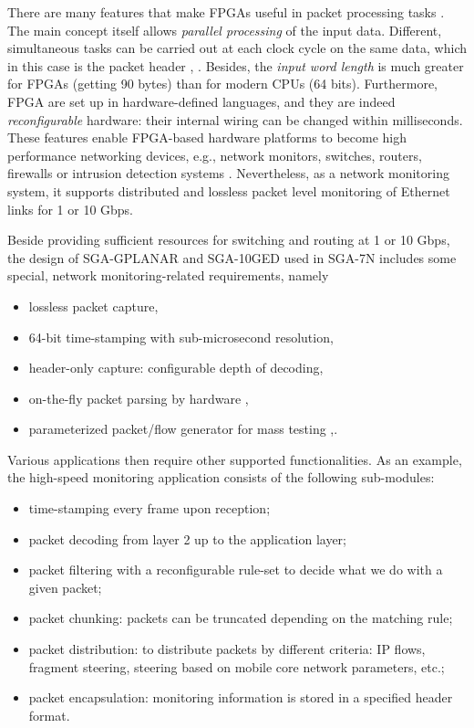 \documentclass[journal]{IEEEtran}
\begin{document}
There are many features that make FPGAs useful in packet processing tasks \cite{NetFPGA}. The main concept itself allows \emph{parallel processing} of the input data. Different, simultaneous tasks can be carried out at each clock cycle on the same data, which in this case is the packet header \cite{XILINX_PacketProc}, \cite{Weirong_Scalable_PacketProc_FPGA}. Besides, the \emph{input word length} is much greater for FPGAs (getting 90 bytes) than for modern CPUs (64 bits). Furthermore, FPGA are set up in hardware-defined languages, and they are indeed \emph{reconfigurable} hardware: their internal wiring can be changed within milliseconds. These features enable FPGA-based hardware platforms to become high performance networking devices, e.g., network monitors, switches, routers, firewalls or intrusion detection systems \cite{IM_2015_FPGA}. Nevertheless, as a network monitoring system, it supports distributed and lossless packet level monitoring of Ethernet links for 1 or 10 Gbps.

Beside providing sufficient resources for switching and routing at 1 or 10 Gbps, the design of SGA-GPLANAR \cite{GPLANAR} and SGA-10GED \cite{10GED} used in SGA-7N includes some special, network monitoring-related requirements, namely 
\begin{itemize}
\renewcommand\labelitemi{--}
\item lossless packet capture,
\item 64-bit time-stamping with sub-microsecond resolution,
\item header-only capture: configurable depth of decoding,
\item on-the-fly packet parsing by hardware \cite{Low_Latency_Header_Parser},
\item parameterized packet/flow generator for mass testing \cite{Olaszi_Complex_Load_Testing_of_Mobile_PS_and_CS_Core},\cite{Soos_Mesterproba}.
\end{itemize}

Various applications then require other supported functionalities. As an example, the high-speed monitoring application \cite{C-GEP_HPSR} consists of the following sub-modules:
\begin{itemize}
\renewcommand\labelitemi{--}
\item time-stamping every frame upon reception;
\item packet decoding from layer 2  up to the application layer;
\item packet filtering with a reconfigurable rule-set to decide what we do with a given packet;
\item packet chunking: packets can be truncated depending on the matching rule;
\item packet distribution: to distribute packets by different criteria: IP flows, fragment steering, steering based on mobile core network parameters, etc.;
\item packet encapsulation: monitoring information is stored in a specified header format.
\end{itemize}
\end{document}
